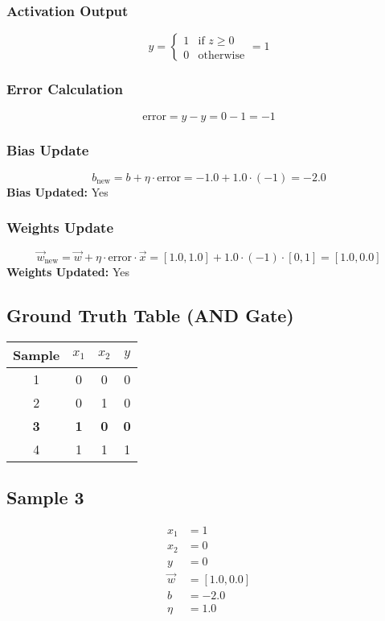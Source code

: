 \documentclass{article}
\begin{document}
\subsubsection*{Activation Output}
\[
\hat{y} =
\begin{cases}
1 & \text{if } z \geq 0 \\
0 & \text{otherwise}
\end{cases}
= 1
\]

\subsubsection*{Error Calculation}
\[
\text{error} = y - \hat{y} = 0 - 1 = -1
\]

\subsubsection*{Bias Update}
\[
b_{\text{new}} = b + \eta \cdot \text{error} = -1.0 + 1.0 \cdot (-1) = -2.0
\]
\textbf{Bias Updated:} Yes

\subsubsection*{Weights Update}
\[
\vec{w}_{\text{new}} = \vec{w} + \eta \cdot \text{error} \cdot \vec{x} = 
[1.0, 1.0] + 1.0 \cdot (-1) \cdot [0, 1] = 
[1.0, 0.0]
\]
\textbf{Weights Updated:} Yes

\subsection*{Ground Truth Table (AND Gate)}
\begin{center}
\begin{tabular}{|c|c|c|c|}
\hline
\textbf{Sample} & $x_1$ & $x_2$ & $y$ \\
\hline
1 & 0 & 0 & 0 \\
\hline
2 & 0 & 1 & 0 \\
\hline
\rowcolor{yellow} \textbf{3} & \textbf{1} & \textbf{0} & \textbf{0} \\
\hline
4 & 1 & 1 & 1 \\
\hline
\end{tabular}
\end{center}

\subsection*{Sample 3}
\begin{align*}
x_1 &= 1 \\
x_2 &= 0 \\
y &= 0 \\
\vec{w} &= [1.0, 0.0] \\
b &= -2.0 \\
\eta &= 1.0
\end{align*}
\end{document}
